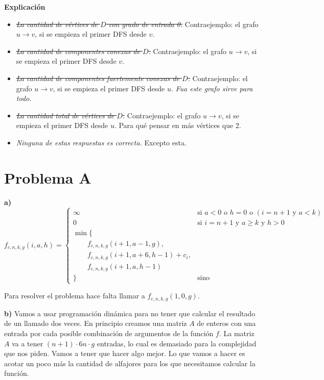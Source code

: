 \documentclass{article}
\begin{document}
\textbf{Explicación}

\begin{itemize}
    \item \sout{\textit{La cantidad de vértices de $D$ con grado de entrada 0.}} Contraejemplo: el grafo $u \rightarrow v$, si se empieza el primer DFS desde $v$.
    \item \sout{\textit{La cantidad de componentes conexas de $D$.}} Contraejemplo: el grafo $u \rightarrow v$, si se empieza el primer DFS desde $v$.
    \item \sout{\textit{La cantidad de componentes fuertemente conexas de $D$.}} Contraejemplo: el grafo $u \rightarrow v$, si se empieza el primer DFS desde $u$. \textit{Fua este grafo sirve para todo.}
    \item \sout{\textit{La cantidad total de vértices de $D$.}} Contraejemplo: el grafo $u \rightarrow v$, si se empieza el primer DFS desde $u$. Para qué pensar en más vértices que 2.
    \item \textit{Ninguna de estas respuestas es correcta.} Excepto esta.
\end{itemize}

\section*{Problema A}

\textbf{a)} \[
f_{c,n,k,g}(i,a,h) = \begin{cases}
\infty & \text{si } a < 0 \text{ o } h = 0 \text{ o } (i = n+1 \text{ y } a < k)\\
0 & \text{si } i = n+1 \text{ y } a \geq k \text{ y } h > 0\\
\min\{\\
\qquad f_{c,n,k,g}(i+1,a-1,g),\\
\qquad f_{c,n,k,g}(i+1,a+6,h-1) + c_i,\\
\qquad f_{c,n,k,g}(i+1,a,h-1)\\
\} & \text{sino}
\end{cases}
\]

Para resolver el problema hace falta llamar a $f_{c,n,k,g}(1,0,g)$.

\textbf{b)} Vamos a usar programación dinámica para no tener que calcular el resultado de un llamado dos veces. En principio creamos una matriz $A$ de enteros con una entrada por cada posible combinación de argumentos de la función $f$. La matriz $A$ va a tener $(n+1) \cdot 6n \cdot g$ entradas, lo cual es demasiado para la complejidad que nos piden. Vamos a tener que hacer algo mejor. Lo que vamos a hacer es acotar un poco más la cantidad de alfajores para los que necesitamos calcular la función.
\end{document}
